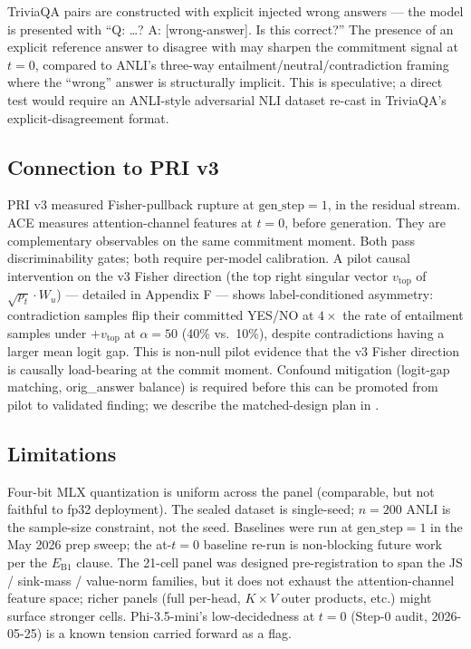 \documentclass[10pt, letterpaper]{article}
\newcommand{\eb}[1]{$E_{\text{B}#1}$}
\begin{document}
TriviaQA pairs are constructed with explicit injected wrong answers
--- the model is presented with ``Q: \ldots? A: [wrong-answer]. Is
this correct?'' The presence of an explicit reference answer to
disagree with may sharpen the commitment signal at $t{=}0$, compared
to ANLI's three-way entailment/neutral/contradiction framing where
the ``wrong'' answer is structurally implicit. This is speculative;
a direct test would require an ANLI-style adversarial NLI dataset
re-cast in TriviaQA's explicit-disagreement format.

\subsection{Connection to PRI v3}

PRI v3 \citep{kitti2026pri} measured Fisher-pullback rupture
at $\text{gen\_step}{=}1$, in the residual stream. ACE measures
attention-channel features at $t{=}0$, before generation. They are
complementary observables on the same commitment moment. Both pass
discriminability gates; both require per-model calibration. A pilot
causal intervention on the v3 Fisher direction (the top right
singular vector $v_\text{top}$ of $\sqrt{p_t} \cdot W_u$) --- detailed
in Appendix F --- shows label-conditioned asymmetry: contradiction
samples flip their committed YES/NO at $4\times$ the rate of
entailment samples under $+v_\text{top}$ at $\alpha{=}50$ (40\%
vs.\ 10\%), despite contradictions having a larger mean logit gap.
This is non-null pilot evidence that the v3 Fisher direction is
causally load-bearing at the commit moment. Confound mitigation
(logit-gap matching, orig\_answer balance) is required before this
can be promoted from pilot to validated finding; we describe the
matched-design plan in .

\subsection{Limitations}

Four-bit MLX quantization is uniform across the panel (comparable,
but not faithful to fp32 deployment). The sealed dataset is
single-seed; $n{=}200$ ANLI is the sample-size constraint, not the
seed. Baselines were run at $\text{gen\_step}{=}1$ in the May 2026
prep sweep; the at-$t{=}0$ baseline re-run is non-blocking future
work per the \eb{1} clause. The 21-cell panel was designed
pre-registration to span the JS / sink-mass / value-norm families,
but it does not exhaust the attention-channel feature space; richer
panels (full per-head, $K \times V$ outer products, etc.) might
surface stronger cells. Phi-3.5-mini's low-decidedness at $t{=}0$
(Step-0 audit, 2026-05-25) is a known tension carried forward as a
flag.
\end{document}

